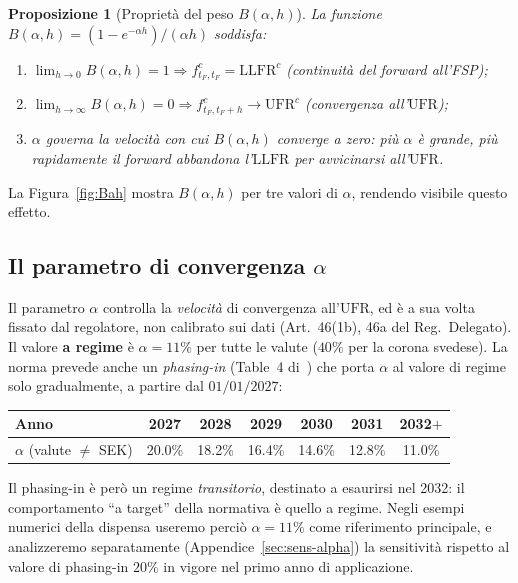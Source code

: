 \documentclass[11pt,a4paper]{article}
\theoremstyle{plain}
\newtheorem{proposizione}[teorema]{Proposizione}
\theoremstyle{definition}
\theoremstyle{remark}
\newcommand{\UFR}{\mathrm{UFR}}
\newcommand{\LLFR}{\mathrm{LLFR}}
\begin{document}
\begin{proposizione}[Propriet\`a del peso $B(\alpha,h)$]
\label{prop:Bah}
La funzione $B(\alpha,h)=(1-e^{-\alpha h})/(\alpha h)$ soddisfa:
\begin{enumerate}
  \item $\lim_{h\to 0} B(\alpha,h)=1 \Rightarrow f^c_{t_F,t_F}=\LLFR^c$ (continuit\`a del
        forward all'FSP);
  \item $\lim_{h\to\infty} B(\alpha,h)=0 \Rightarrow f^c_{t_F,t_F+h}\to\UFR^c$ (convergenza
        all'$\UFR$);
  \item $\alpha$ governa la velocit\`a con cui $B(\alpha,h)$ converge a zero: pi\`u $\alpha$ \`e
        grande, pi\`u rapidamente il forward abbandona l'$\LLFR$ per avvicinarsi all'$\UFR$.
\end{enumerate}
\end{proposizione}

La Figura~\ref{fig:Bah} mostra $B(\alpha,h)$ per tre valori di $\alpha$, rendendo visibile
questo effetto.

\subsection{Il parametro di convergenza \texorpdfstring{$\alpha$}{alpha}}
\label{sec:alpha}

Il parametro $\alpha$ controlla la \emph{velocit\`a} di convergenza all'$\UFR$, ed \`e a sua
volta fissato dal regolatore, non calibrato sui dati (Art.~46(1b), 46a del Reg.~Delegato). Il valore \textbf{a
regime} \`e $\alpha=11\%$ per tutte le valute ($40\%$ per la corona svedese). La norma prevede anche un
\emph{phasing-in} (Table~4 di~\cite{eiopa2026}) che porta $\alpha$ al valore di regime solo
gradualmente, a partire dal $01/01/2027$:
\begin{center}\small
\renewcommand{\arraystretch}{1.15}
\begin{tabular}{lcccccc}
\toprule
Anno & 2027 & 2028 & 2029 & 2030 & 2031 & 2032$+$\\
\midrule
$\alpha$ (valute $\neq$ SEK) & 20.0\% & 18.2\% & 16.4\% & 14.6\% & 12.8\% & 11.0\%\\
\bottomrule
\end{tabular}
\end{center}
Il phasing-in \`e per\`o un regime \emph{transitorio}, destinato a esaurirsi nel 2032: il
comportamento ``a target'' della normativa \`e quello a regime. Negli esempi numerici della
dispensa useremo perci\`o $\alpha=11\%$ come riferimento principale, e analizzeremo
separatamente (Appendice~\ref{sec:sens-alpha}) la sensitivit\`a rispetto al valore di
phasing-in $20\%$ in vigore nel primo anno di applicazione.
\end{document}
